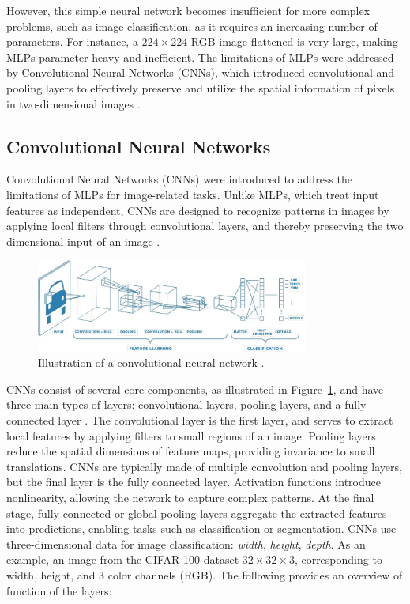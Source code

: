 However, this simple neural network becomes insufficient for more complex problems, such as image classification, as it requires an increasing number of parameters. For instance, a $224\times 224$ RGB image flattened is very large, making MLPs parameter-heavy and inefficient. The limitations of MLPs were addressed by Convolutional Neural Networks (CNNs), which introduced convolutional and pooling layers to effectively preserve and utilize the spatial information of pixels in two-dimensional images \cite{zhang2023dive}.



\subsection{Convolutional Neural Networks}
\label{sec:CNNs}
Convolutional Neural Networks (CNNs) \cite{lecun1995} were introduced to address the limitations of MLPs for image-related tasks. Unlike MLPs, which treat input features as independent, CNNs are designed to recognize patterns in images by applying local filters through convolutional layers, and thereby preserving the two dimensional input of an image \cite{lecun1998,NIPS2012_c399862d,zhang2023dive}. 

\begin{figure}[ht]
    \centering
    \includegraphics[width=0.8\textwidth]{Images/CNN_illustration.jpg} 
    \caption{Illustration of a convolutional neural network \cite{mathworks_cnn}.}
    \label{fig:cnn_illustration}
\end{figure}

\noindent CNNs consist of several core components, as illustrated in Figure~\ref{fig:cnn_illustration}, and have three main types of layers: convolutional layers, pooling layers, and a fully connected layer \cite{cs231n}. The convolutional layer is the first layer, and serves to extract local features by applying filters to small regions of an image. Pooling layers reduce the spatial dimensions of feature maps, providing invariance to small translations. CNNs are typically made of multiple convolution and pooling layers, but the final layer is the fully connected layer. Activation functions introduce nonlinearity, allowing the network to capture complex patterns. At the final stage, fully connected or global pooling layers aggregate the extracted features into predictions, enabling tasks such as classification or segmentation. CNNs use three-dimensional data for image classification: \emph{width}, \emph{height}, \emph{depth}. As an example, an image from the CIFAR-100 dataset $32\times 32\times 3$, corresponding to width, height, and 3 color channels (RGB). The following provides an overview of function of the layers:

